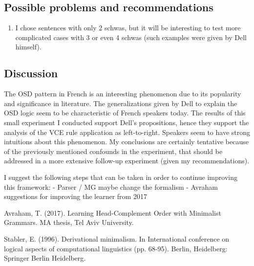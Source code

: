 \documentclass{article}
\begin{document}
\subsection{Possible problems and recommendations}
\begin{enumerate}
  \item I chose sentences with only 2 schwas, but it will be interesting to test more complicated cases with 3 or even 4 schwas (such examples were given by Dell himself).
\end{enumerate}

\subsection{Discussion}
The OSD pattern in French is an interesting phenomenon due to its popularity and significance in literature. The generalizations given by Dell to explain the OSD logic seem to be characteristic of French speakers today. The results of this small experiment I conducted support Dell's propositions, hence they support the analysis of the VCE rule application as left-to-right. Speakers seem to have strong intuitions about this phenomenon.
My conclusions are certainly tentative because of the previously mentioned confounds in the experiment,  that should be addressed in a more extensive follow-up experiment (given my recommendations).

I suggest the following steps that can be taken in order to continue improving this framework:
- Parser / MG maybe change the formalism
- Avraham suggestions for improving the learner from 2017 %


\clearpage
\fancyhead{} %

\begin{thebibliography}{} %

Avraham, T. (2017). 
Learning Head-Complement Order with Minimalist Grammars.
MA thesis, Tel Aviv University.


Stabler, E. (1996). 
Derivational minimalism. In International conference on logical aspects of computational linguistics (pp. 68-95). 
Berlin, Heidelberg: Springer Berlin Heidelberg.


\end{thebibliography}
\end{document}
